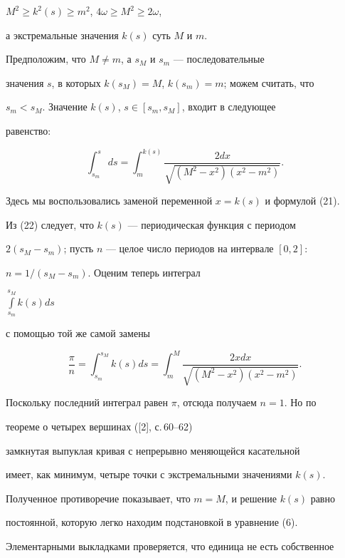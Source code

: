 \begin{pf}
$M^2 \ge k^2(s) \ge m^2$, $4\omega \ge M^2 \ge 2\omega$,


а экстремальные значения $k(s)$ суть $M$ и $m$.





Предположим, что $M \neq m$, а $s_M$ и $s_m$ --- последовательные


значения $s$, в которых $k(s_M)=M$, $k(s_m)=m$; можем считать, что


$s_m<s_M$. Значение $k(s)$, $s \in [s_m, s_M]$, входит в следующее


равенство:


\begin{equation}


\int_{s_m}^{s} ds=\int_{m}^{k(s)} \frac{2dx}


{\sqrt{(M^2 -x^2) (x^2- m^2)}}.


\end{equation}


Здесь мы воспользовались заменой переменной $x=k(s)$ и формулой (21).


Из (22) следует, что $k(s)$ --- периодическая функция с периодом


$2 (s_M-s_m)$; пусть $n$ --- целое число периодов на интервале $[0,2]$:


$n=1/(s_M-s_m)$. Оценим теперь интеграл


$\int\limits_{s_m}^{s_M} k(s) ds$


с помощью той же самой замены


$$


\frac{\pi}{n}=\int_{s_m}^{s_M}k(s)ds=\int_m^M \frac{2x dx}


{\sqrt{({M^2 -x^2}) ({x^2- m^2})}}.


$$


Поскольку последний интеграл равен $\pi$, отсюда получаем $n=1$. Но по


теореме о четырех вершинах ([2], с.\,60--62)


замкнутая выпуклая кривая с непрерывно меняющейся касательной


имеет, как минимум, четыре точки с экстремальными значениями $k(s)$.


Полученное противоречие показывает, что $m=M$, и решение $k(s)$ равно


постоянной, которую легко находим подстановкой в уравнение (6).





Элементарными выкладками проверяется, что единица не есть собственное



\end{pf}
